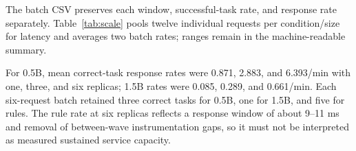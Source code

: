 The batch CSV preserves each window, successful-task rate, and response rate separately. Table~\ref{tab:scale} pools twelve individual requests per condition/size for latency and averages two batch rates; ranges remain in the machine-readable summary.

For 0.5B, mean correct-task response rates were 0.871, 2.883, and 6.393/min with one, three, and six replicas; 1.5B rates were 0.085, 0.289, and 0.661/min. Each six-request batch retained three correct tasks for 0.5B, one for 1.5B, and five for rules. The rule rate at six replicas reflects a response window of about 9--11 ms and removal of between-wave instrumentation gaps, so it must not be interpreted as measured sustained service capacity.
